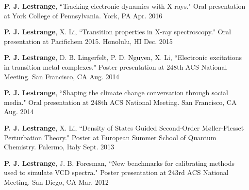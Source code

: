 


\begin{cvpresentations}


\cvpresentation
{\textbf{P. J. Lestrange}, ``Tracking electronic dynamics with X-rays."  Oral presentation at York College of Pennsylvania.} %
{York, PA} %
{Apr. 2016} %


\cvpresentation
{\textbf{P. J. Lestrange}, X. Li, ``Transition properties in X-ray spectroscopy." Oral presentation at Pacifichem 2015.} %
{Honolulu, HI} %
{Dec. 2015} %


\cvpresentation
{\textbf{P. J. Lestrange}, D. B. Lingerfelt, P. D. Nguyen, X. Li, ``Electronic excitations in transition metal complexes." Poster presentation at 248th ACS National Meeting.} %
{San Francisco, CA} %
{Aug. 2014} %


\cvpresentation
{\textbf{P. J. Lestrange}, ``Shaping the climate change conversation through social media." \newline Oral presentation at 248th ACS National Meeting.} %
{San Francisco, CA} %
{Aug. 2014} %


\cvpresentation
{\textbf{P. J. Lestrange}, X. Li, ``Density of States Guided Second-Order M{\o}ller-Plesset Perturbation Theory." Poster at European Summer School of Quantum Chemistry.} %
{Palermo, Italy} %
{Sept. 2013} %


\cvpresentation
{\textbf{P. J. Lestrange}, J. B. Foresman, ``New benchmarks for calibrating methods used to simulate VCD spectra." Poster presentation at 243rd ACS National Meeting.} %
{San Diego, CA} %
{Mar. 2012} %


\end{cvpresentations}
